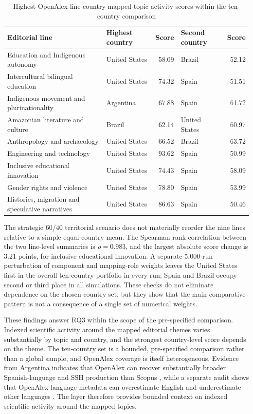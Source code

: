 \documentclass[futureinternet,article,submit,moreauthors]{Definitions/mdpi}
\begin{document}
\begin{table}[htbp]
\caption{Highest OpenAlex line-country mapped-topic activity scores within the ten-country comparison}\label{tab:openalex_top}
\small
\begin{tabularx}{\textwidth}{@{}Yp{0.22\textwidth}rp{0.22\textwidth}r@{}}
\toprule
Editorial line & Highest country & Score & Second country & Score \\
\midrule
Education and Indigenous autonomy & United States & 58.09 & Brazil & 52.12 \\
Intercultural bilingual education & United States & 74.32 & Spain & 51.51 \\
Indigenous movement and plurinationality & Argentina & 67.88 & Spain & 61.72 \\
Amazonian literature and culture & Brazil & 62.14 & United States & 60.97 \\
Anthropology and archaeology & United States & 66.52 & Brazil & 63.72 \\
Engineering and technology & United States & 93.62 & Spain & 50.99 \\
Inclusive educational innovation & United States & 74.43 & Spain & 58.09 \\
Gender rights and violence & United States & 78.80 & Spain & 53.99 \\
Histories, migration and speculative narratives & United States & 86.63 & Spain & 50.46 \\
\bottomrule
\end{tabularx}
\end{table}

The strategic 60/40 territorial scenario does not materially reorder the nine lines relative to a simple equal-country mean. The Spearman rank correlation between the two line-level summaries is $\rho=0.983$, and the largest absolute score change is 3.21 points, for inclusive educational innovation. A separate 5,000-run perturbation of component and mapping-role weights leaves the United States first in the overall ten-country portfolio in every run; Spain and Brazil occupy second or third place in all simulations. These checks do not eliminate dependence on the chosen country set, but they show that the main comparative pattern is not a consequence of a single set of numerical weights.

These findings answer RQ3 within the scope of the pre-specified comparison. Indexed scientific activity around the mapped editorial themes varies substantially by topic and country, and the strongest country-level score depends on the theme. The ten-country set is a bounded, pre-specified comparison rather than a global sample, and OpenAlex coverage is itself heterogeneous. Evidence from Argentina indicates that OpenAlex can recover substantially broader Spanish-language and SSH production than Scopus \citep{gallardo2024openalex}, while a separate audit shows that OpenAlex language metadata can overestimate English and underestimate other languages \citep{cespedes2025linguistic}. The layer therefore provides bounded context on indexed scientific activity around the mapped topics.
\end{document}
